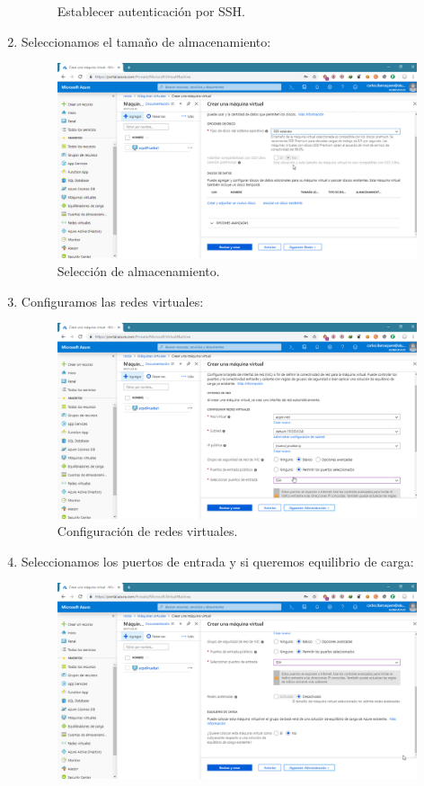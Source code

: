 \begin{enumerate}
\begin{figure}[h]
		\caption{Establecer autenticación por SSH.}
		\label{Establecer autenticación por SSH}
	\end{figure}
\newpage
	\item Seleccionamos el tamaño de almacenamiento:
	\begin{figure}[h]
		\centering
		\includegraphics[scale=0.35]{ImagenesAzure/MV/3.png}
		\caption{Selección de almacenamiento.}
		\label{Selección de almacenamiento2}
	\end{figure}
	\item Configuramos las redes virtuales:
	\begin{figure}[h]
		\centering
		\includegraphics[scale=0.35]{ImagenesAzure/MV/4.png}
		\caption{Configuración de redes virtuales.}
		\label{Configuración de redes virtuales}
	\end{figure}
\newpage
	\item Seleccionamos los puertos de entrada y si queremos equilibrio de carga:
	\begin{figure}[h]
		\centering
		\includegraphics[scale=0.35]{ImagenesAzure/MV/5.png}

\end{figure}
\end{enumerate}
